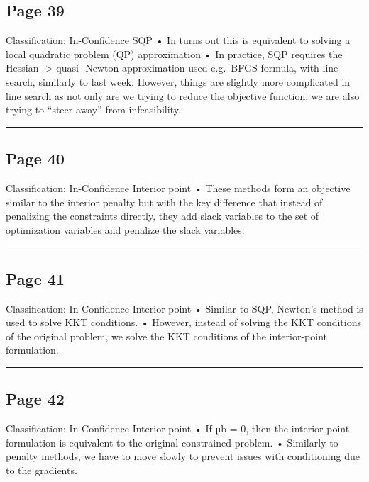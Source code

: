 \documentclass[
]{article}
\begin{document}
\subsection{Page 39}\label{page-39}

Classification: In-Confidence SQP • In turns out this is equivalent to
solving a local quadratic problem (QP) approximation • In practice, SQP
requires the Hessian -\textgreater{} quasi- Newton approximation used
e.g.~BFGS formula, with line search, similarly to last week\emph{. }
However, things are slightly more complicated in line search as not only
are we trying to reduce the objective function, we are also trying to
``steer away'' from infeasibility.

\begin{center}\rule{0.5\linewidth}{0.5pt}\end{center}

\subsection{Page 40}\label{page-40}

Classification: In-Confidence Interior point • These methods form an
objective similar to the interior penalty but with the key difference
that instead of penalizing the constraints directly, they add slack
variables to the set of optimization variables and penalize the slack
variables.

\begin{center}\rule{0.5\linewidth}{0.5pt}\end{center}

\subsection{Page 41}\label{page-41}

Classification: In-Confidence Interior point • Similar to SQP, Newton's
method is used to solve KKT conditions. • However, instead of solving
the KKT conditions of the original problem, we solve the KKT conditions
of the interior-point formulation.

\begin{center}\rule{0.5\linewidth}{0.5pt}\end{center}

\subsection{Page 42}\label{page-42}

Classification: In-Confidence Interior point • If µb = 0, then the
interior-point formulation is equivalent to the original constrained
problem. • Similarly to penalty methods, we have to move slowly to
prevent issues with conditioning due to the gradients.
\end{document}
